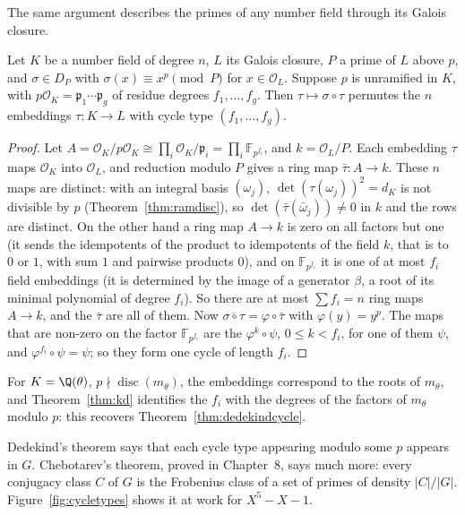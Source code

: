 The same argument describes the primes of any number field through its Galois closure.

\begin{proposition}\label{prop:frobembed}
Let $K$ be a number field of degree $n$, $L$ its Galois closure, $P$ a prime of $L$ above $p$, and $\sigma\in D_P$ with
$\sigma(x)\equiv x^p\pmod P$ for $x\in\mathcal O_L$. Suppose $p$ is unramified in $K$, with $p\mathcal O_K=\mathfrak p_1
\cdots\mathfrak p_g$ of residue degrees $f_1,\dots,f_g$. Then $\tau\mapsto\sigma\circ\tau$ permutes the $n$ embeddings
$\tau:K\to L$ with cycle type $(f_1,\dots,f_g)$.
\end{proposition}
\begin{proof}
Let $A=\mathcal O_K/p\mathcal O_K\cong\prod_i\mathcal O_K/\mathfrak p_i=\prod_i\mathbb F_{p^{f_i}}$, and $k=\mathcal O_L/P$.
Each embedding $\tau$ maps $\mathcal O_K$ into $\mathcal O_L$, and reduction modulo $P$ gives a ring map $\bar\tau:A\to
k$. These $n$ maps are distinct: with an integral basis $(\omega_j)$, $\det(\tau(\omega_j))^2=d_K$ is not divisible by
$p$ (Theorem~\ref{thm:ramdisc}), so $\det(\bar\tau(\bar\omega_j))\ne0$ in $k$ and the rows are distinct. On the other
hand a ring map $A\to k$ is zero on all factors but one (it sends the idempotents of the product to idempotents of
the field $k$, that is to $0$ or $1$, with sum $1$ and pairwise products $0$), and on $\mathbb F_{p^{f_i}}$ it is one of at most $f_i$ field
embeddings (it is determined by the image of a generator $\beta$, a root of its minimal polynomial of degree $f_i$). So
there are at most $\sum f_i=n$ ring maps $A\to k$, and the $\bar\tau$ are all of them. Now $\overline{\sigma\circ\tau}=
\varphi\circ\bar\tau$ with $\varphi(y)=y^p$. The maps that are non-zero on the factor $\mathbb F_{p^{f_i}}$ are the
$\varphi^k\circ\psi$, $0\le k<f_i$, for one of them $\psi$, and $\varphi^{f_i}\circ\psi=\psi$; so they form one cycle of
length $f_i$.
\end{proof}

For $K=\Q(\theta)$, $p\nmid\operatorname{disc}(m_\theta)$, the embeddings correspond to the roots of $m_\theta$, and
Theorem~\ref{thm:kd} identifies the $f_i$ with the degrees of the factors of $m_\theta$ modulo $p$: this recovers
Theorem~\ref{thm:dedekindcycle}.

Dedekind's theorem says that each cycle type appearing modulo some $p$ appears in $G$. Chebotarev's theorem, proved in
Chapter~8, says much more: every conjugacy class $C$ of $G$ is the Frobenius class of a set of primes of density
$|C|/|G|$. Figure~\ref{fig:cycletypes} shows it at work for $X^5-X-1$.

